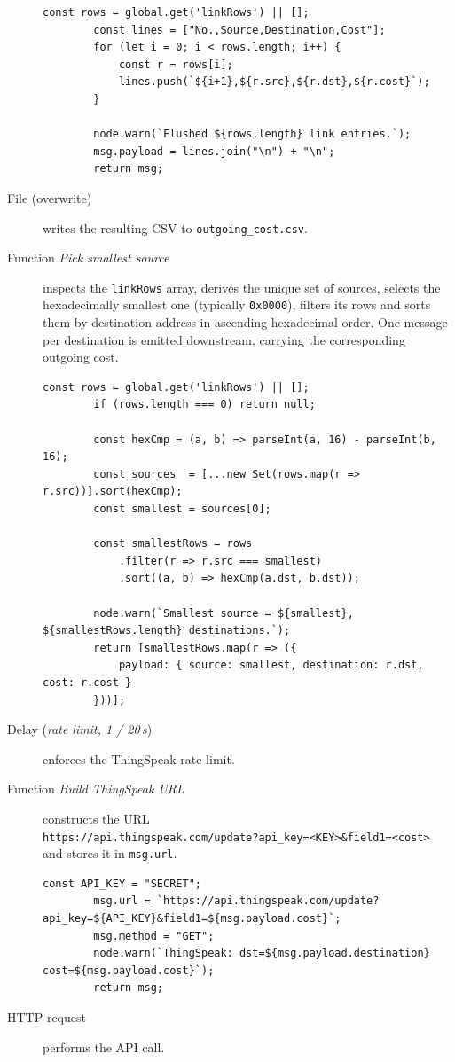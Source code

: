 \begin{description}
\begin{lstlisting}[]
        const rows = global.get('linkRows') || [];
        const lines = ["No.,Source,Destination,Cost"];
        for (let i = 0; i < rows.length; i++) {
            const r = rows[i];
            lines.push(`${i+1},${r.src},${r.dst},${r.cost}`);
        }
        
        node.warn(`Flushed ${rows.length} link entries.`);
        msg.payload = lines.join("\n") + "\n";
        return msg;
        \end{lstlisting}
    \item[File (overwrite)] writes the resulting CSV to
        \texttt{outgoing\_cost.csv}.
    \item[Function \emph{Pick smallest source}] inspects the
        \verb|linkRows| array, derives the unique set of sources,
        selects the hexadecimally smallest one (typically
        \texttt{0x0000}), filters its rows and sorts them by
        destination address in ascending hexadecimal order. One
        message per destination is emitted downstream, carrying the
        corresponding outgoing cost.
        \begin{lstlisting}[]
        const rows = global.get('linkRows') || [];
        if (rows.length === 0) return null;
        
        const hexCmp = (a, b) => parseInt(a, 16) - parseInt(b, 16);
        const sources  = [...new Set(rows.map(r => r.src))].sort(hexCmp);
        const smallest = sources[0];
        
        const smallestRows = rows
            .filter(r => r.src === smallest)
            .sort((a, b) => hexCmp(a.dst, b.dst));
        
        node.warn(`Smallest source = ${smallest}, ${smallestRows.length} destinations.`);
        return [smallestRows.map(r => ({
            payload: { source: smallest, destination: r.dst, cost: r.cost }
        }))];
        \end{lstlisting}


    \item[Delay (\emph{rate limit, 1 / 20\,s})] enforces the ThingSpeak
        rate limit.
    \item[Function \emph{Build ThingSpeak URL}] constructs the URL\\
        \verb|https://api.thingspeak.com/update?api_key=<KEY>&field1=<cost>|\\
        and stores it in \verb|msg.url|.
        \begin{lstlisting}[]
        const API_KEY = "SECRET";
        msg.url = `https://api.thingspeak.com/update?api_key=${API_KEY}&field1=${msg.payload.cost}`;
        msg.method = "GET";
        node.warn(`ThingSpeak: dst=${msg.payload.destination} cost=${msg.payload.cost}`);
        return msg;
        \end{lstlisting}
    \item[HTTP request] performs the API call.
\end{description}